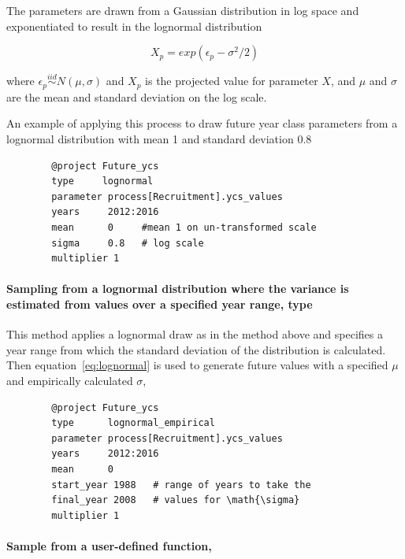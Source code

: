 The parameters are drawn from a Gaussian distribution in log space and exponentiated  to result in the lognormal distribution

\begin{equation}\label{eq:lognormal}
X_p = exp(\epsilon_p - \sigma^2 / 2)
\end{equation}

where $\epsilon_p\stackrel{iid}{\sim}N(\mu,\sigma)$ and $X_p$ is the projected value for parameter $X$, and $\mu$ and $\sigma$ are the mean and standard deviation on the log scale.

An example of applying this process to draw future year class parameters from a lognormal distribution with mean 1 and standard deviation 0.8

{\small{\begin{verbatim}
		@project Future_ycs
		type     lognormal
		parameter process[Recruitment].ycs_values
		years     2012:2016
		mean      0     #mean 1 on un-transformed scale
		sigma     0.8   # log scale
		multiplier 1
		\end{verbatim}}}

\paragraph[Lognormal-Empirical]{Sampling from a lognormal distribution where the  variance is estimated from values over a specified year range, type   }\label{sec:Project-LogNormalEmpirical} 

This method applies a lognormal draw as in the  method above and specifies a year range from which the standard deviation of the distribution is calculated. Then equation~\eqref{eq:lognormal} is used to generate future values with a specified $\mu$ and empirically calculated $\sigma$,

{\small{\begin{verbatim}
		@project Future_ycs
		type      lognormal_empirical
		parameter process[Recruitment].ycs_values
		years     2012:2016
		mean      0
		start_year 1988   # range of years to take the
		final_year 2008   # values for \math{\sigma}
		multiplier 1
		\end{verbatim}}}

\paragraph[User Defined]{Sample from a user-defined function, }\label{sec:Project-UserDefined} 

